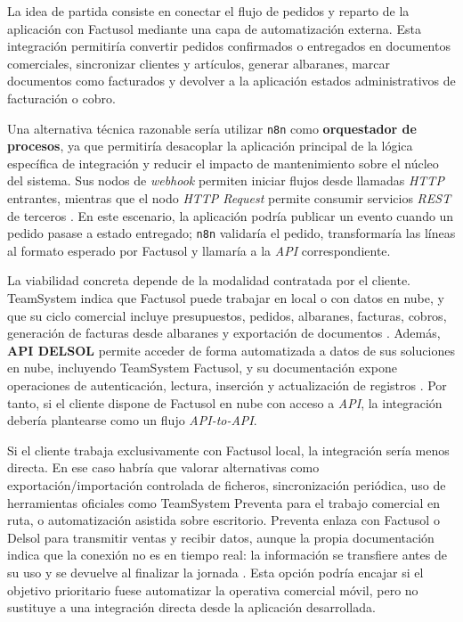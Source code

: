 La idea de partida consiste en conectar el flujo de pedidos y reparto de la aplicación con Factusol mediante una capa de automatización externa. Esta integración permitiría convertir pedidos confirmados o entregados en documentos comerciales, sincronizar clientes y artículos, generar albaranes, marcar documentos como facturados y devolver a la aplicación estados administrativos de facturación o cobro.

Una alternativa técnica razonable sería utilizar \texttt{n8n} como \textbf{orquestador de procesos}, ya que permitiría desacoplar la aplicación principal de la lógica específica de integración y reducir el impacto de mantenimiento sobre el núcleo del sistema. Sus nodos de \textit{webhook} permiten iniciar flujos desde llamadas \textit{HTTP} entrantes, mientras que el nodo \textit{HTTP Request} permite consumir servicios \textit{REST} de terceros \citep{n8n-webhook,n8n-http-request}. En este escenario, la aplicación podría publicar un evento cuando un pedido pasase a estado entregado; \texttt{n8n} validaría el pedido, transformaría las líneas al formato esperado por Factusol y llamaría a la \textit{API} correspondiente.

La viabilidad concreta depende de la modalidad contratada por el cliente. TeamSystem indica que Factusol puede trabajar en local o con datos en nube, y que su ciclo comercial incluye presupuestos, pedidos, albaranes, facturas, cobros, generación de facturas desde albaranes y exportación de documentos \citep{sdelsol-factusol}. Además, \textbf{API DELSOL} permite acceder de forma automatizada a datos de sus soluciones en nube, incluyendo TeamSystem Factusol, y su documentación expone operaciones de autenticación, lectura, inserción y actualización de registros \citep{sdelsol-api,sdelsol-api-doc}. Por tanto, si el cliente dispone de Factusol en nube con acceso a \textit{API}, la integración debería plantearse como un flujo \textit{API-to-API}.

Si el cliente trabaja exclusivamente con Factusol local, la integración sería menos directa. En ese caso habría que valorar alternativas como exportación/importación controlada de ficheros, sincronización periódica, uso de herramientas oficiales como TeamSystem Preventa para el trabajo comercial en ruta, o automatización asistida sobre escritorio. Preventa enlaza con Factusol o Delsol para transmitir ventas y recibir datos, aunque la propia documentación indica que la conexión no es en tiempo real: la información se transfiere antes de su uso y se devuelve al finalizar la jornada \citep{sdelsol-preventa}. Esta opción podría encajar si el objetivo prioritario fuese automatizar la operativa comercial móvil, pero no sustituye a una integración directa desde la aplicación desarrollada.

